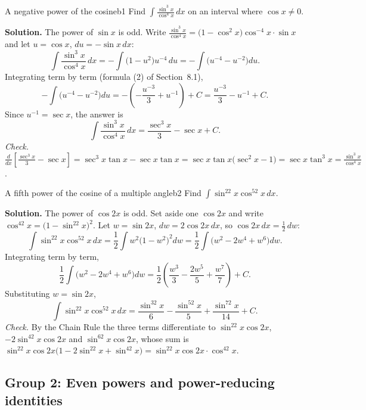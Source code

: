 \documentclass[11pt]{article}
\begin{document}
\begin{exmp}{A negative power of the cosine}{b1}
Find $\int\frac{\sin^3x}{\cos^4x}\,dx$ on an interval where $\cos x\ne0$.

\textbf{Solution.} The power of $\sin x$ is odd. Write $\frac{\sin^3x}{\cos^4x}=\big(1-\cos^2x\big)\cos^{-4}x\cdot\sin x$ and let $u=\cos x$, $du=-\sin x\,dx$:
\[\int\frac{\sin^3x}{\cos^4x}\,dx=-\int\big(1-u^2\big)u^{-4}\,du=-\int\big(u^{-4}-u^{-2}\big)du .\]
Integrating term by term (formula (2) of Section~8.1),
\[-\int\big(u^{-4}-u^{-2}\big)du=-\left(-\frac{u^{-3}}3+u^{-1}\right)+C=\frac{u^{-3}}3-u^{-1}+C .\]
Since $u^{-1}=\sec x$, the answer is
\[\int\frac{\sin^3x}{\cos^4x}\,dx=\frac{\sec^3x}3-\sec x+C .\]
\emph{Check.} $\frac{d}{dx}\left[\frac{\sec^3x}3-\sec x\right]=\sec^3x\tan x-\sec x\tan x=\sec x\tan x\big(\sec^2x-1\big)=\sec x\tan^3x=\frac{\sin^3x}{\cos^4x}$.
\end{exmp}

\begin{exmp}{A fifth power of the cosine of a multiple angle}{b2}
Find $\int\sin^22x\cos^52x\,dx$.

\textbf{Solution.} The power of $\cos2x$ is odd. Set aside one $\cos2x$ and write $\cos^42x=\big(1-\sin^22x\big)^2$. Let $w=\sin2x$, $dw=2\cos2x\,dx$, so $\cos2x\,dx=\frac12\,dw$:
\[\int\sin^22x\cos^52x\,dx=\frac12\int w^2\big(1-w^2\big)^2dw=\frac12\int\big(w^2-2w^4+w^6\big)dw .\]
Integrating term by term,
\[\frac12\int\big(w^2-2w^4+w^6\big)dw=\frac12\left(\frac{w^3}3-\frac{2w^5}5+\frac{w^7}7\right)+C .\]
Substituting $w=\sin2x$,
\[\int\sin^22x\cos^52x\,dx=\frac{\sin^32x}6-\frac{\sin^52x}5+\frac{\sin^72x}{14}+C .\]
\emph{Check.} By the Chain Rule the three terms differentiate to $\sin^22x\cos2x$, $-2\sin^42x\cos2x$ and $\sin^62x\cos2x$, whose sum is $\sin^22x\cos2x\big(1-2\sin^22x+\sin^42x\big)=\sin^22x\cos2x\cdot\cos^42x$.
\end{exmp}

\subsection*{Group 2: Even powers and power-reducing identities}
\end{document}
